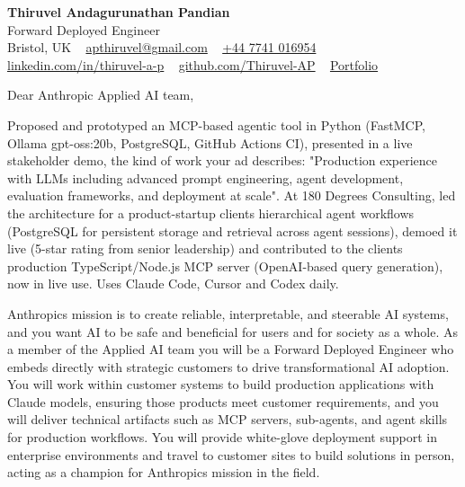 \documentclass[11pt,a4paper]{article}
\begin{document}
\raggedright
\pagestyle{empty}

\begin{center}
    {\LARGE \color{linkblue} \textbf{Thiruvel Andagurunathan Pandian}}\\[0.2cm]
    {\fontsize{12}{14}\selectfont\color{headernavy} Forward Deployed Engineer}\\[0.2cm]
    {\small Bristol, UK\nobreak\ \,\textperiodcentered\, \href{mailto:apthiruvel@gmail.com}{apthiruvel@gmail.com}\nobreak\ \,\textperiodcentered\, \href{tel:+447741016954}{+44 7741 016954}\nobreak\ \,\textperiodcentered\, \href{https://www.linkedin.com/in/thiruvel-a-p/}{linkedin.com/in/thiruvel-a-p}\nobreak\ \,\textperiodcentered\, \href{https://github.com/Thiruvel-AP}{github.com/Thiruvel-AP}\nobreak\ \,\textperiodcentered\, \href{https://thiruvel-ap.github.io/PersonalPortfolio/}{Portfolio}}

\end{center}

\vspace{0.4cm}

\noindent
Dear Anthropic Applied AI team,

Proposed and prototyped an MCP-based agentic tool in Python (FastMCP, Ollama gpt-oss:20b, PostgreSQL, GitHub Actions CI), presented in a live stakeholder demo, the kind of work your ad describes: "Production experience with LLMs including advanced prompt engineering, agent development, evaluation frameworks, and deployment at scale". At 180 Degrees Consulting, led the architecture for a product-startup client\textquotesingle{}s hierarchical agent workflows (PostgreSQL for persistent storage and retrieval across agent sessions), demoed it live (5-star rating from senior leadership) and contributed to the client\textquotesingle{}s production TypeScript/Node.js MCP server (OpenAI-based query generation), now in live use. Uses Claude Code, Cursor and Codex daily.

Anthropic\textquotesingle{}s mission is to create reliable, interpretable, and steerable AI systems, and you want AI to be safe and beneficial for users and for society as a whole. As a member of the Applied AI team you will be a Forward Deployed Engineer who embeds directly with strategic customers to drive transformational AI adoption. You will work within customer systems to build production applications with Claude models, ensuring those products meet customer requirements, and you will deliver technical artifacts such as MCP servers, sub-agents, and agent skills for production workflows. You will provide white-glove deployment support in enterprise environments and travel to customer sites to build solutions in person, acting as a champion for Anthropic\textquotesingle{}s mission in the field.
\end{document}
